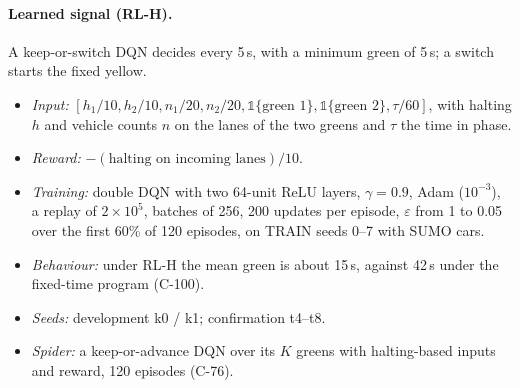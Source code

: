 \documentclass[11pt]{article}
\begin{document}
\paragraph{Learned signal (RL-H).} A keep-or-switch DQN decides every 5\,s, with a minimum green of 5\,s; a switch starts the fixed yellow.
\begin{itemize}\setlength\itemsep{0pt}
\item \emph{Input:} $[h_1/10,h_2/10,n_1/20,n_2/20,\mathbb 1\{\text{green }1\},\mathbb 1\{\text{green }2\},\tau/60]$, with halting $h$ and
vehicle counts $n$ on the lanes of the two greens and $\tau$ the time in phase.
\item \emph{Reward:} $-(\text{halting on incoming lanes})/10$.
\item \emph{Training:} double DQN with two 64-unit ReLU layers, $\gamma=0.9$, Adam ($10^{-3}$), a replay of $2\times10^5$, batches of 256,
200 updates per episode, $\varepsilon$ from 1 to 0.05 over the first 60\% of 120 episodes, on TRAIN seeds 0--7 with SUMO cars.
\item \emph{Behaviour:} under RL-H the mean green is about 15\,s, against 42\,s under the fixed-time program (C-100).
\item \emph{Seeds:} development k0 / k1; confirmation t4--t8.
\item \emph{Spider:} a keep-or-advance DQN over its $K$ greens with halting-based inputs and reward, 120 episodes (C-76).
\end{itemize}
\end{document}
